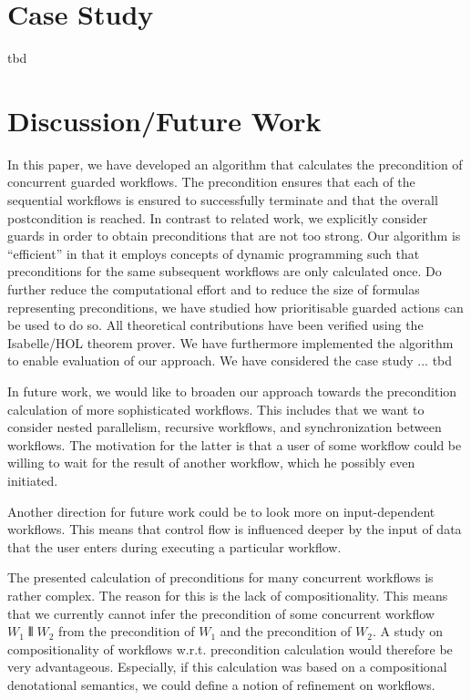 \documentclass[11pt]{article}
\newcommand{\TODO}[1]{{\color{red} #1}}
\begin{document}
\section{Case Study}

\TODO{tbd}
  
\section{Discussion/Future Work}

In this paper, we have developed an algorithm that calculates the precondition of concurrent guarded workflows. The precondition ensures that each of the sequential workflows is ensured to successfully terminate and that the overall postcondition is reached. In contrast to related work, we explicitly consider guards in order to obtain preconditions that are not too strong. Our algorithm is ``efficient'' in that it employs concepts of dynamic programming such that preconditions for the same subsequent workflows are only calculated once. Do further reduce the computational effort and to reduce the size of formulas representing preconditions, we have studied how prioritisable guarded actions can be used to do so. All theoretical contributions have been verified using the Isabelle/HOL theorem prover. We have furthermore implemented the algorithm to enable evaluation of our approach. We have considered the case study ... \TODO{tbd}

In future work, we would like to broaden our approach towards the precondition calculation of more sophisticated workflows. This includes that we want to consider nested parallelism, recursive workflows, and synchronization between workflows. The motivation for the latter is that a user of some workflow could be willing to wait for the result of another workflow, which he possibly even initiated.

Another direction for future work could be to look more on input-dependent workflows. This means that control flow is influenced deeper by the input of data that the user enters during executing a particular workflow.

The presented calculation of preconditions for many concurrent workflows is rather complex. The reason for this is the lack of compositionality. This means that we currently cannot infer the precondition of some concurrent workflow $W_1 \interleave W_2$ from the precondition of $W_1$ and the precondition of $W_2$. A study on compositionality of workflows w.r.t. precondition calculation would therefore be very advantageous. Especially, if this calculation was based on a compositional denotational semantics, we could define a notion of refinement on workflows.




\appendix
\end{document}
